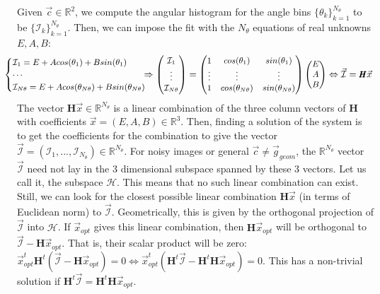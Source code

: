 \documentclass[11pt, a4paper, twoside]{article} %
\newcommand{\R}{\mathbb{R}} %
\DeclareRobustCommand{\mybox}[2][gray!10]{%
\begin{tcolorbox}[   %
        left=0.2cm,
        right=0.2cm,
        top=0.15cm,
        bottom=0.15cm,
        colback=#1,
        colframe=#1,
        width=\dimexpr\textwidth\relax, 
        enlarge left by=0mm,
        boxsep=5pt,
        arc=0pt,outer arc=0pt,
        ]
        #2
\end{tcolorbox}
}
\begin{document}
\mybox{Given $\vec{c}\in\R^2$, we compute the angular histogram for the angle bins $\{\theta_k\}_{k=1}^{N_\theta}$ to be $\{\mathcal{I}_k\}_{k=1}^{N_\theta}$. Then, we can impose the fit with the $N_\theta$ equations of real unknowns $E,A,B$:
\begin{equation}
\small
\hspace*{-0.5cm}
\begin{cases}
\mathcal{I}_1=E+Acos(\theta_1)+Bsin(\theta_1)\\
\cdots\\
\mathcal{I}_{N\theta}=E+Acos(\theta_{N\theta})+Bsin(\theta_{N\theta})
\end{cases}\hspace*{-0.5cm}\Rightarrow
\begin{pmatrix}
\mathcal{I}_1\\
\vdots\\
\mathcal{I}_{N\theta}
\end{pmatrix}=\begin{pmatrix}
1 & cos(\theta_1) & sin(\theta_1)\\
\vdots&\vdots&\vdots\\
1 & cos(\theta_{N\theta}) & sin(\theta_{N\theta})
\end{pmatrix}\begin{pmatrix}
E\\
A\\
B
\end{pmatrix}\Leftrightarrow \vec{\mathcal{I}}=\pmb{H}\vec{x}
\end{equation}
The vector $\pmb{H}\vec{x}\in\R^{N_\theta}$ is a linear combination of the three column vectors of $\pmb{H}$ with coefficients $\vec{x}=(E,A,B)\in\R^3$. Then, finding a solution of the system is to get the coefficients for the combination to give the vector $\vec{\mathcal{I}}=(\mathcal{I}_1,...,\mathcal{I}_{N_\theta})\in\R^{N_\theta}$. For noisy images or general $\vec{c}\neq \vec{g}_{geom}$, the $\R^{N_\theta}$ vector $\vec{\mathcal{I}}$ need not lay in the 3 dimensional subspace spanned by these 3 vectors. Let us call it, the subspace $\mathcal{H}$. This means that no such linear combination can exist. Still, we can look for the closest possible linear combination $\pmb{H}\vec{x}$ (in terms of Euclidean norm) to $\vec{\mathcal{I}}$. Geometrically, this is given by the orthogonal projection of $\vec{\mathcal{I}}$ into $\mathcal{H}$. If $\vec{x}_{opt}$ gives this linear combination, then $\pmb{H}\vec{x}_{opt}$ will be orthogonal to $\vec{\mathcal{I}}-\pmb{H}\vec{x}_{opt}$. That is, their scalar product will be zero: $\vec{x}_{opt}^t\pmb{H}^{t}(\vec{\mathcal{I}}-\pmb{H}\vec{x}_{opt})=0\Leftrightarrow \vec{x}_{opt}^t(\pmb{H}^t\vec{\mathcal{I}}-\pmb{H}^t\pmb{H}\vec{x}_{opt})=0$. This has a non-trivial solution if $\pmb{H}^t\vec{\mathcal{I}}=\pmb{H}^t\pmb{H}\vec{x}_{opt}$. \vspace{0.1cm}

}
\end{document}
